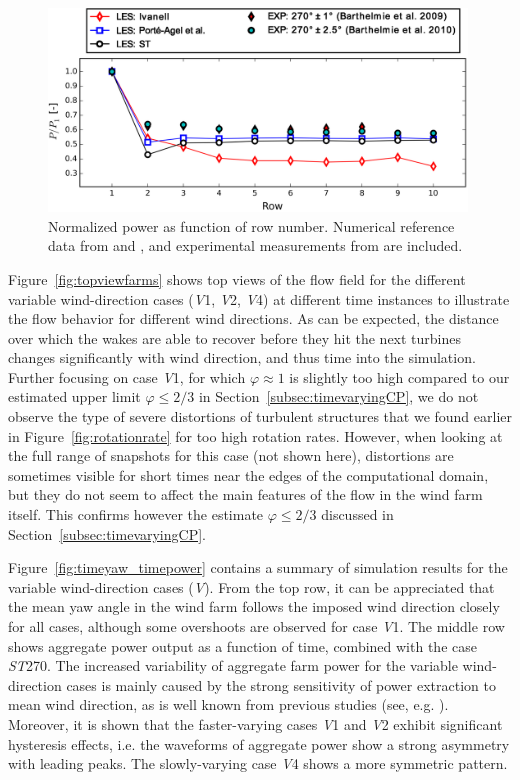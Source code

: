 		\begin{figure}[ht]
			\centering
			\includegraphics[width=0.99\textwidth]{chapters/turbulent_inflow/blm/figure10.eps}
			\caption{Normalized power as function of row number. Numerical reference data from \cite{ivanell2009numerical} and \cite{porte2013numerical}, and experimental measurements from \cite{barthelmie2009modelling, barthelmie2010quantifying} are included. }
			\label{fig:hornsrevsteady}
		\end{figure}
		
		Figure~\ref{fig:topviewfarms} shows top views of the flow field for the different variable wind-direction cases (\emph{V}1, \emph{V}2, \emph{V}4) at different time instances to illustrate the flow behavior for different wind directions. As can be expected, the distance over which the wakes are able to recover before they hit the next turbines changes significantly with wind direction, and thus time into the simulation. Further focusing on case \emph{V}1, for which $\varphi\approx 1$ is slightly too high compared to our estimated upper limit  $\varphi \leq 2/3$  in Section~\ref{subsec:timevaryingCP}, we do not observe the type of severe distortions of turbulent structures that we found earlier in Figure~\ref{fig:rotationrate} for too high rotation rates. However, when looking at the full range of snapshots for this case (not shown here), distortions are sometimes visible for short times near the edges of the computational domain, but they do not seem to affect the main features of the flow in the wind farm itself. This confirms however the estimate $\varphi \leq 2/3$ discussed in Section~\ref{subsec:timevaryingCP}.
		
		Figure~\ref{fig:timeyaw_timepower} contains a summary of simulation results for the variable wind-direction cases (\emph{V}). From the
		top row, it can be appreciated that the mean yaw angle in the wind farm follows the imposed  wind direction closely for all cases,
		although some overshoots are observed for case \emph{V}1. The middle row shows aggregate power output as a function of time, combined
		with the case \emph{ST}270. The increased variability of aggregate farm power for the variable wind-direction cases is mainly caused
		by the strong sensitivity of power extraction to mean wind direction, as is well known from previous studies (see, e.g. \citealp{barthelmie2010quantifying, porte2013numerical}). Moreover, it is shown that the faster-varying cases \emph{V}1 and \emph{V}2 exhibit significant hysteresis effects, i.e. the waveforms of aggregate power show a strong asymmetry with leading peaks. The slowly-varying case \emph{V}4 shows a more symmetric pattern.
		
